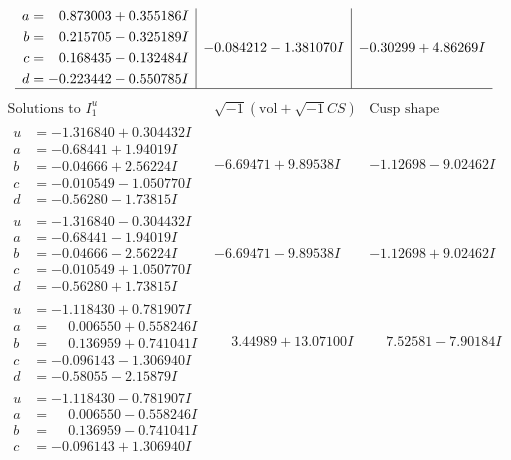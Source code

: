 \documentclass[1p]{elsarticle_modified}
\theoremstyle{definition}
\newcommand{\I}{\sqrt{-1}}
\begin{document}
$$\begin{array}{c|c|c}
\begin{aligned}
a &= \phantom{-}0.873003 + 0.355186 I \\
b &= \phantom{-}0.215705 - 0.325189 I \\
c &= \phantom{-}0.168435 - 0.132484 I \\
d &= -0.223442 - 0.550785 I\end{aligned}
 & -0.084212 - 1.381070 I & -0.30299 + 4.86269 I\\
 \hline 
 \end{array}$$\newpage$$\begin{array}{c|c|c}  
\text{Solutions to }I^u_{1}& \I (\text{vol} + \sqrt{-1}CS) & \text{Cusp shape}\\
 \hline 
\begin{aligned}
u &= -1.316840 + 0.304432 I \\
a &= -0.68441 + 1.94019 I \\
b &= -0.04666 + 2.56224 I \\
c &= -0.010549 - 1.050770 I \\
d &= -0.56280 - 1.73815 I\end{aligned}
 & -6.69471 + 9.89538 I & -1.12698 - 9.02462 I \\ \hline\begin{aligned}
u &= -1.316840 - 0.304432 I \\
a &= -0.68441 - 1.94019 I \\
b &= -0.04666 - 2.56224 I \\
c &= -0.010549 + 1.050770 I \\
d &= -0.56280 + 1.73815 I\end{aligned}
 & -6.69471 - 9.89538 I & -1.12698 + 9.02462 I \\ \hline\begin{aligned}
u &= -1.118430 + 0.781907 I \\
a &= \phantom{-}0.006550 + 0.558246 I \\
b &= \phantom{-}0.136959 + 0.741041 I \\
c &= -0.096143 - 1.306940 I \\
d &= -0.58055 - 2.15879 I\end{aligned}
 & \phantom{-}3.44989 + 13.07100 I & \phantom{-}7.52581 - 7.90184 I \\ \hline\begin{aligned}
u &= -1.118430 - 0.781907 I \\
a &= \phantom{-}0.006550 - 0.558246 I \\
b &= \phantom{-}0.136959 - 0.741041 I \\
c &= -0.096143 + 1.306940 I \\

\end{aligned}
\end{array}$$
\end{document}
